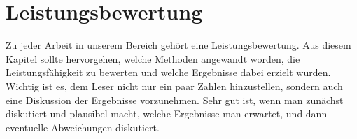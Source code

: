 \chapter{ Leistungsbewertung }\label{chap:Leistungsbewertung}
Zu jeder Arbeit in unserem Bereich gehört eine Leistungsbewertung. Aus diesem Kapitel sollte hervorgehen, welche Methoden angewandt worden, die Leistungsfähigkeit zu bewerten und welche Ergebnisse dabei erzielt wurden. Wichtig ist es, dem Leser nicht nur ein paar Zahlen hinzustellen, sondern auch eine Diskussion der Ergebnisse vorzunehmen. Sehr gut ist, wenn man zunächst diskutiert und plausibel macht, welche Ergebnisse man erwartet, und dann eventuelle Abweichungen diskutiert.
